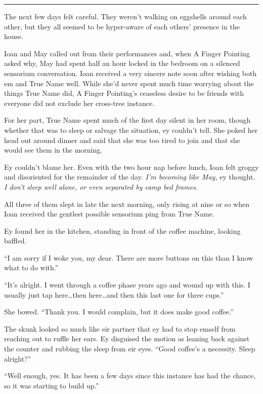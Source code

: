 \begin{center}\rule{0.5\linewidth}{0.5pt}\end{center}

The next few days felt careful. They weren't walking on eggshells around each other, but they all seemed to be hyper-aware of each others' presence in the house.

Ioan and May called out from their performances and, when A Finger Pointing asked why, May had spent half an hour locked in the bedroom on a silenced sensorium conversation. Ioan received a very sincere note soon after wishing both em and True Name well. While she'd never spent much time worrying about the things True Name did, A Finger Pointing's ceaseless desire to be friends with everyone did not exclude her cross-tree instance.

For her part, True Name spent much of the first day silent in her room, though whether that was to sleep or salvage the situation, ey couldn't tell. She poked her head out around dinner and said that she was too tired to join and that she would see them in the morning.

Ey couldn't blame her. Even with the two hour nap before lunch, Ioan felt groggy and disoriented for the remainder of the day. \emph{I'm becoming like May,} ey thought. \emph{I don't sleep well alone, or even separated by camp bed frames.}

All three of them slept in late the next morning, only rising at nine or so when Ioan received the gentlest possible sensorium ping from True Name.

Ey found her in the kitchen, standing in front of the coffee machine, looking baffled.

``I am sorry if I woke you, my dear. There are more buttons on this than I know what to do with.''

``It's alright. I went through a coffee phase years ago and wound up with this. I usually just tap here\ldots then here\ldots and then this last one for three cups.''

She bowed. ``Thank you. I would complain, but it does make good coffee.''

The skunk looked so much like eir partner that ey had to stop emself from reaching out to ruffle her ears. Ey disguised the motion as leaning back against the counter and rubbing the sleep from eir eyes. ``Good coffee's a necessity. Sleep alright?''

``Well enough, yes. It has been a few days since this instance has had the chance, so it was starting to build up.''

